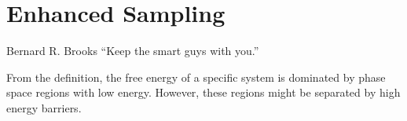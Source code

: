 \chapter{Enhanced Sampling\label{chapter:ES}}
\begin{chapquote}{Bernard R. Brooks%
	}
	``Keep the smart guys with you.''
\end{chapquote}
From the definition, the free energy of a specific system is dominated by phase space regions with low energy. However, these regions might be separated by high energy barriers. 




